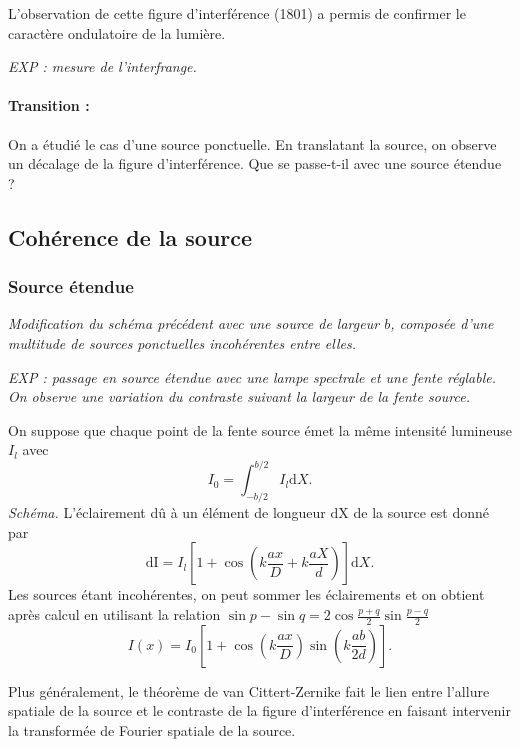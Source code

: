 L'observation de cette figure d'interférence (1801) a permis de confirmer le caractère ondulatoire de la lumière.

\emph{EXP : mesure de l'interfrange.}

\paragraph{Transition : } On a étudié le cas d'une source ponctuelle. En translatant la source, on observe un décalage de la figure d'interférence. Que se passe-t-il avec une source étendue ?

\subsection{Cohérence de la source}

\subsubsection{Source étendue}

\emph{Modification du schéma précédent avec une source de largeur $b$, composée d'une multitude de sources ponctuelles incohérentes entre elles.}

\emph{EXP : passage en source étendue avec une lampe spectrale et une fente réglable. On observe une variation du contraste suivant la largeur de la fente source.}

On suppose que chaque point de la fente source émet la même intensité lumineuse $I_l$ avec
\begin{equation}
I_0 = \int_{-b/2}^{b/2} I_l \mathrm{d}X.
\end{equation}
\emph{Schéma.}
L'éclairement dû à un élément de longueur $\mathrm{dX}$ de la source est donné par
\begin{equation}
\mathrm{dI} = I_l\left[1+\cos\left(k\frac{ax}{D}+k\frac{aX}{d}\right)\right]\mathrm{d}X.
\end{equation}
Les sources étant incohérentes, on peut sommer les éclairements et on obtient après calcul en utilisant la relation $\sin p - \sin q = 2\cos\frac{p+q}{2}\sin\frac{p-q}{2}$
\begin{equation}
I(x) = I_0\left[1+\cos\left(k\frac{ax}{D}\right)\sin\left(k\frac{ab}{2d}\right)\right].
\end{equation}

Plus généralement, le théorème de van Cittert-Zernike fait le lien entre l'allure spatiale de la source et le contraste de la figure d'interférence en faisant intervenir la transformée de Fourier spatiale de la source.

